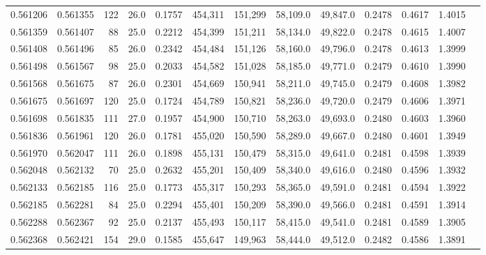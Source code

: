 \begin{tabular}{rrrrrrrrrrrrr}
0.561206 & 0.561355 &   122 & 26.0 &                                     0.1757 & 454,311 & 151,299 &  58,109.0 &  49,847.0 & 0.2478 & 0.4617 & 1.4015 \\
0.561359 & 0.561407 &    88 & 25.0 &                                     0.2212 & 454,399 & 151,211 &  58,134.0 &  49,822.0 & 0.2478 & 0.4615 & 1.4007 \\
0.561408 & 0.561496 &    85 & 26.0 &                                     0.2342 & 454,484 & 151,126 &  58,160.0 &  49,796.0 & 0.2478 & 0.4613 & 1.3999 \\
0.561498 & 0.561567 &    98 & 25.0 &                                     0.2033 & 454,582 & 151,028 &  58,185.0 &  49,771.0 & 0.2479 & 0.4610 & 1.3990 \\
0.561568 & 0.561675 &    87 & 26.0 &                                     0.2301 & 454,669 & 150,941 &  58,211.0 &  49,745.0 & 0.2479 & 0.4608 & 1.3982 \\
0.561675 & 0.561697 &   120 & 25.0 &                                     0.1724 & 454,789 & 150,821 &  58,236.0 &  49,720.0 & 0.2479 & 0.4606 & 1.3971 \\
0.561698 & 0.561835 &   111 & 27.0 &                                     0.1957 & 454,900 & 150,710 &  58,263.0 &  49,693.0 & 0.2480 & 0.4603 & 1.3960 \\
0.561836 & 0.561961 &   120 & 26.0 &                                     0.1781 & 455,020 & 150,590 &  58,289.0 &  49,667.0 & 0.2480 & 0.4601 & 1.3949 \\
0.561970 & 0.562047 &   111 & 26.0 &                                     0.1898 & 455,131 & 150,479 &  58,315.0 &  49,641.0 & 0.2481 & 0.4598 & 1.3939 \\
0.562048 & 0.562132 &    70 & 25.0 &                                     0.2632 & 455,201 & 150,409 &  58,340.0 &  49,616.0 & 0.2480 & 0.4596 & 1.3932 \\
0.562133 & 0.562185 &   116 & 25.0 &                                     0.1773 & 455,317 & 150,293 &  58,365.0 &  49,591.0 & 0.2481 & 0.4594 & 1.3922 \\
0.562185 & 0.562281 &    84 & 25.0 &                                     0.2294 & 455,401 & 150,209 &  58,390.0 &  49,566.0 & 0.2481 & 0.4591 & 1.3914 \\
0.562288 & 0.562367 &    92 & 25.0 &                                     0.2137 & 455,493 & 150,117 &  58,415.0 &  49,541.0 & 0.2481 & 0.4589 & 1.3905 \\
0.562368 & 0.562421 &   154 & 29.0 &                                     0.1585 & 455,647 & 149,963 &  58,444.0 &  49,512.0 & 0.2482 & 0.4586 & 1.3891 \\

\end{tabular}
